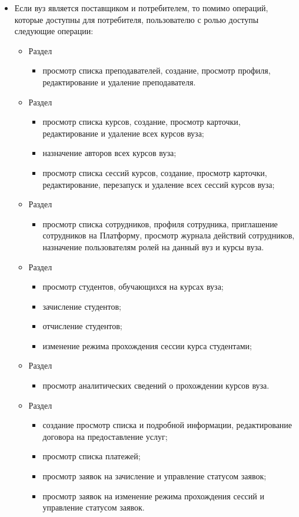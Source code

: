 \begin{enumerate}
\begin{itemize}
		\item Если вуз является поставщиком и потребителем, то помимо операций, которые доступны для потребителя, пользователю с ролью  доступы следующие операции:
		\begin{itemize}
			\item Раздел 
			\begin{itemize}
				\item просмотр списка преподавателей, создание, просмотр профиля, редактирование и удаление преподавателя.
			\end{itemize}			
			\item Раздел 
			\begin{itemize}
				\item просмотр списка курсов, создание, просмотр карточки, редактирование и удаление всех курсов вуза;
				\item назначение авторов всех курсов вуза;
				\item просмотр списка сессий курсов, создание, просмотр карточки, редактирование, перезапуск и удаление всех сессий курсов вуза;
			\end{itemize}
			\item Раздел 
			\begin{itemize}
				\item просмотр списка сотрудников, профиля сотрудника, приглашение сотрудников на Платформу, просмотр журнала действий сотрудников, назначение пользователям ролей на данный вуз и курсы вуза.
			\end{itemize}
			\item Раздел 
			\begin{itemize}
				\item просмотр студентов, обучающихся на курсах вуза;
				\item зачисление студентов;
				\item отчисление студентов;
				\item изменение режима прохождения сессии курса студентами;
			\end{itemize}
			\item Раздел 
			\begin{itemize}
				\item просмотр аналитических сведений о прохождении курсов вуза.
			\end{itemize}
			\item Раздел 
			\begin{itemize}
				\item создание просмотр списка и подробной информации, редактирование договора на предоставление услуг;
				\item просмотр списка платежей;
				\item просмотр заявок на зачисление и управление статусом заявок;
				\item просмотр заявок на изменение режима прохождения сессий и управление статусом заявок.
			\end{itemize}			
		\end{itemize}


\end{itemize}
\end{enumerate}
